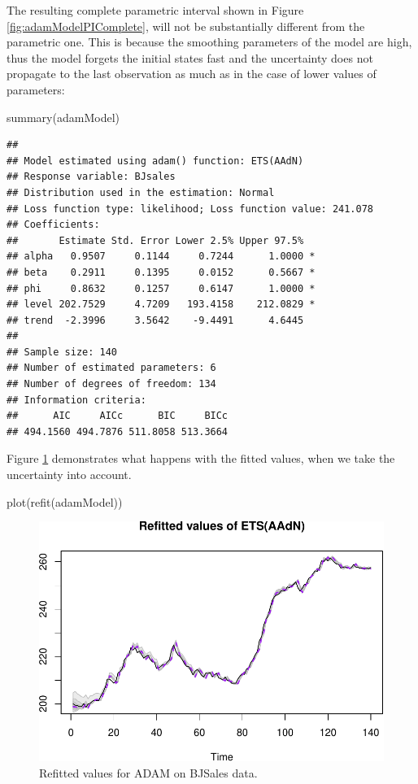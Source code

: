 \documentclass[
]{book}
\newenvironment{Shaded}{\begin{snugshade}}{\end{snugshade}}
\newcommand{\FunctionTok}[1]{\textcolor[rgb]{0.00,0.00,0.00}{#1}}
\newcommand{\NormalTok}[1]{#1}
\theoremstyle{definition}
\theoremstyle{definition}
\theoremstyle{definition}
\theoremstyle{definition}
\theoremstyle{remark}
\begin{document}
The resulting complete parametric interval shown in Figure \ref{fig:adamModelPIComplete}, will not be substantially different from the parametric one. This is because the smoothing parameters of the model are high, thus the model forgets the initial states fast and the uncertainty does not propagate to the last observation as much as in the case of lower values of parameters:

\begin{Shaded}
\begin{Highlighting}[]
\FunctionTok{summary}\NormalTok{(adamModel)}
\end{Highlighting}
\end{Shaded}

\begin{verbatim}
## 
## Model estimated using adam() function: ETS(AAdN)
## Response variable: BJsales
## Distribution used in the estimation: Normal
## Loss function type: likelihood; Loss function value: 241.078
## Coefficients:
##       Estimate Std. Error Lower 2.5% Upper 97.5%  
## alpha   0.9507     0.1144     0.7244      1.0000 *
## beta    0.2911     0.1395     0.0152      0.5667 *
## phi     0.8632     0.1257     0.6147      1.0000 *
## level 202.7529     4.7209   193.4158    212.0829 *
## trend  -2.3996     3.5642    -9.4491      4.6445  
## 
## Sample size: 140
## Number of estimated parameters: 6
## Number of degrees of freedom: 134
## Information criteria:
##      AIC     AICc      BIC     BICc 
## 494.1560 494.7876 511.8058 513.3664
\end{verbatim}

Figure \ref{fig:adamModelPIRefitted} demonstrates what happens with the fitted values, when we take the uncertainty into account.

\begin{Shaded}
\begin{Highlighting}[]
\FunctionTok{plot}\NormalTok{(}\FunctionTok{refit}\NormalTok{(adamModel))}
\end{Highlighting}
\end{Shaded}

\begin{figure}
\centering
\includegraphics{adam_files/figure-latex/adamModelPIRefitted-1.pdf}
\caption{\label{fig:adamModelPIRefitted}Refitted values for ADAM on BJSales data.}
\end{figure}
\end{document}
